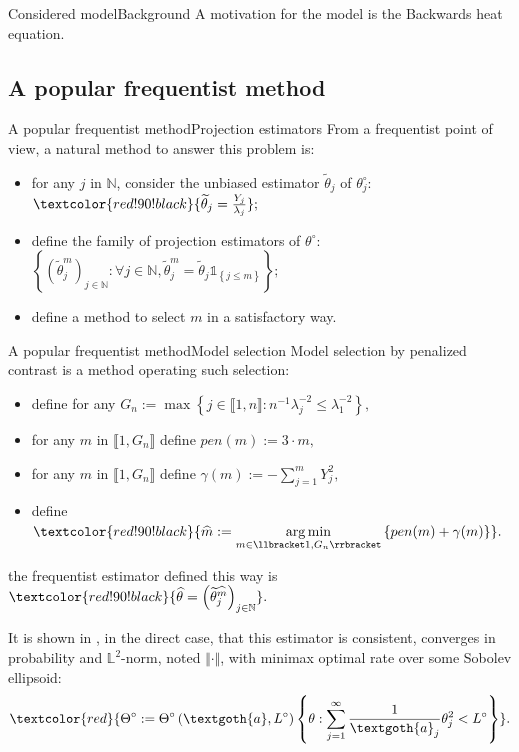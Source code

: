 \documentclass[10pt]{beamer}
\DeclareMathOperator*{\argmin}{arg\,min}
\begin{document}
\begin{frame}{Considered model}{Background}
A motivation for the model is the \textcolor{red!90!black}{Backwards heat equation}.

\end{frame}

\subsection{A popular frequentist method}
\begin{frame}{A popular frequentist method}{Projection estimators}
From a frequentist point of view, a natural method to answer this problem is:
\begin{itemize}
\item<1-> for any $j$ in $\mathbb{N}$, consider the unbiased estimator $\widetilde{\theta}_{j}$ of $\theta^{\circ}_{j}$: $\textcolor{red!90!black}{\widetilde{\theta}_{j} = \frac{Y_{j}}{\lambda_{j}}};$
\item<2-> define the family of projection estimators of $\theta^{\circ}$: $\left\{\left(\widetilde{\theta}^{m}_{j}\right)_{j \in \mathbb{N}} : \forall j \in \mathbb{N}, \widetilde{\theta}^{m}_{j} = \widetilde{\theta}_{j} \mathds{1}_{\left\{j \leq m\right\}} \right\};$
\item<3-> define a method to select $m$ in a satisfactory way.
\end{itemize}
\end{frame}

\begin{frame}{A popular frequentist method}{Model selection}
Model selection by penalized contrast is a method operating such selection:
\begin{itemize}
\item<1-> define for any $G_{n} := \max\left\{j \in \llbracket 1, n \rrbracket : n^{-1} \lambda_{j}^{-2} \leq \lambda_{1}^{-2}\right\},$
\item<2-> for any $m$ in $\llbracket 1, G_{n}\rrbracket$ define $pen(m) := 3 \cdot m,$
\item<3-> for any $m$ in $\llbracket 1, G_{n}\rrbracket$ define $\gamma(m) := -\sum\limits_{j = 1}^{m} Y_{j}^{2},$
\item<4-> define $\textcolor{red!90!black}{\widehat{m} := \argmin\limits_{m \in \llbracket 1, G_{n}\rrbracket}\left\{pen(m) + \gamma(m)\right\}}.$
\end{itemize}

the frequentist estimator defined this way is $\textcolor{red!90!black}{\widehat{\theta} = \left(\widetilde{\theta}^{\widehat{m}}_{j}\right)_{j \in \mathbb{N}}}.$

It is shown in \citet{PM}, in the direct case, that this estimator is \textcolor{red!90!black}{consistent}, converges in probability and $\mathbb{L}^{2}$-norm, noted $\Vert \cdot \Vert$, with \textcolor{red!90!black}{minimax optimal rate} over some Sobolev ellipsoid:
\[\textcolor{red}{\Theta^{\circ} := \Theta^{\circ}\left(\textgoth{a}, L^{\circ}\right) \left\{\theta : \sum\limits_{j = 1}^{\infty} \frac{1}{\textgoth{a}_{j}}\theta_{j}^{2} < L^{\circ}\right\}}.\]
\end{frame}
\end{document}
